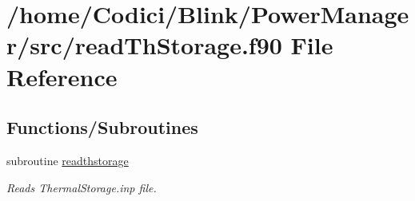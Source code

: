 \hypertarget{read_th_storage_8f90}{\section{/home/\-Codici/\-Blink/\-Power\-Manager/src/read\-Th\-Storage.f90 File Reference}
\label{read_th_storage_8f90}
}
\subsection*{Functions/\-Subroutines}
\begin{DoxyCompactItemize}
\item 
subroutine \hyperlink{read_th_storage_8f90_aa12da0418968e1e7388fbadb2e807303}{readthstorage}
\begin{DoxyCompactList}\small\item\em Reads Thermal\-Storage.\-inp file. \end{DoxyCompactList}\end{DoxyCompactItemize}


